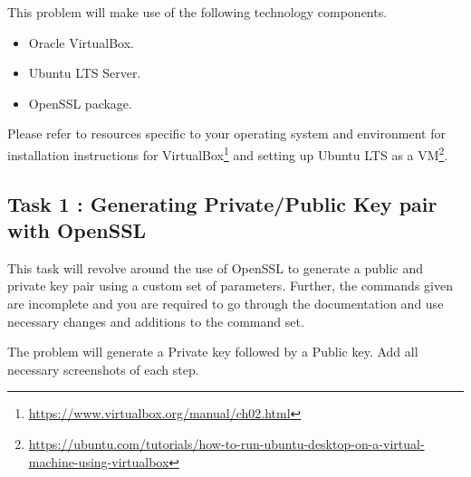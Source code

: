 \documentclass[11pt,letterpaper]{article}
\begin{document}
\medskip
\noindent This problem will make use of the following technology components. 
\smallskip
\begin{itemize}[nolistsep]
	\item Oracle VirtualBox.
	\item Ubuntu LTS Server. 
	\item OpenSSL package.
\end{itemize} 

\smallskip
\noindent Please refer to resources specific to your operating system and environment for installation instructions for VirtualBox\footnote{\url{https://www.virtualbox.org/manual/ch02.html} } and setting up Ubuntu LTS as a VM\footnote{\url{https://ubuntu.com/tutorials/how-to-run-ubuntu-desktop-on-a-virtual-machine-using-virtualbox}}.\

\subsection*{Task 1 : Generating Private/Public Key pair with OpenSSL}

This task will revolve around the use of OpenSSL to generate a public and private key pair using a custom set of parameters. Further, the commands given are incomplete and you are required to go through the documentation and use necessary changes and additions to the command set. 

The problem will generate a Private key followed by a Public key. Add all necessary screenshots of each step. 
%
\end{document}
